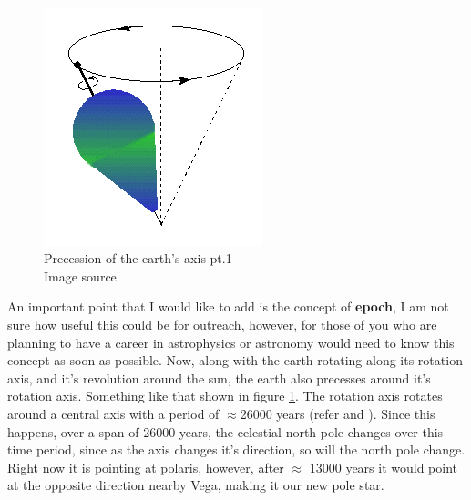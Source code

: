 \documentclass[a4paper,twoside]{article}
\numberwithin{equation}{section}
\begin{document}
\paragraph{}
\begin{figure}
\begin{center}
\includegraphics[width=0.5\linewidth]{fig4.png} 
\caption{Precession of the earth's axis pt.1 \\ Image source \cite{precession1}}
\label{fig4}
\end{center}
\end{figure}
An important point that I would like to add is the concept of \textbf{epoch}, I am not sure how useful this could be for outreach, however, for those of you who are planning to have a career in astrophysics or astronomy would need to know this concept as soon as possible. Now, along with the earth rotating along its rotation axis, and it's revolution around the sun, the earth also precesses around it's rotation axis. Something like that shown in figure \ref{fig4}. The rotation axis rotates around a central axis with a period of $\approx$26000 years (refer \cite{precession1} and \cite{precession3}). Since this happens, over a span of 26000 years, the celestial north pole changes over this time period, since as the axis changes it's direction, so will the north pole change. Right now it is pointing at polaris, however, after $\approx$ 13000 years it would point at the opposite direction nearby Vega, making it our new pole star. 
\end{document}
